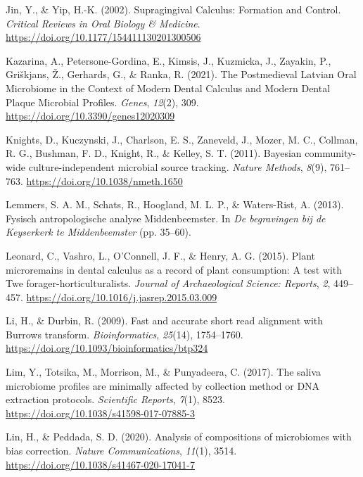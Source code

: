 \documentclass[
  b5paper,
]{book}
\newlength{\cslhangindent}
\newenvironment{CSLReferences}[2] %
 {\begin{list}{}{%
  \setlength{\itemindent}{0pt}
  \setlength{\leftmargin}{0pt}
  \setlength{\parsep}{0pt}
  \ifodd #1
   \setlength{\leftmargin}{\cslhangindent}
   \setlength{\itemindent}{-1\cslhangindent}
  \fi
  \setlength{\itemsep}{#2\baselineskip}}}
 {\end{list}}
\begin{document}
\begin{CSLReferences}{1}{0}
Jin, Y., \& Yip, H.-K. (2002). Supragingival {Calculus}: {Formation} and
{Control}. \emph{Critical Reviews in Oral Biology \& Medicine}.
\url{https://doi.org/10.1177/154411130201300506}

Kazarina, A., Petersone-Gordina, E., Kimsis, J., Kuzmicka, J., Zayakin,
P., Griškjans, Ž., Gerhards, G., \& Ranka, R. (2021). The {Postmedieval
Latvian Oral Microbiome} in the {Context} of {Modern Dental Calculus}
and {Modern Dental Plaque Microbial Profiles}. \emph{Genes},
\emph{12}(2), 309. \url{https://doi.org/10.3390/genes12020309}

Knights, D., Kuczynski, J., Charlson, E. S., Zaneveld, J., Mozer, M. C.,
Collman, R. G., Bushman, F. D., Knight, R., \& Kelley, S. T. (2011).
Bayesian community-wide culture-independent microbial source tracking.
\emph{Nature Methods}, \emph{8}(9), 761--763.
\url{https://doi.org/10.1038/nmeth.1650}

Lemmers, S. A. M., Schats, R., Hoogland, M. L. P., \& Waters-Rist, A.
(2013). {Fysisch antropologische analyse Middenbeemster}. In \emph{{De
begravingen bij de Keyserkerk te Middenbeemster}} (pp. 35--60).

Leonard, C., Vashro, L., O'Connell, J. F., \& Henry, A. G. (2015). Plant
microremains in dental calculus as a record of plant consumption: {A}
test with {Twe} forager-horticulturalists. \emph{Journal of
Archaeological Science: Reports}, \emph{2}, 449--457.
\url{https://doi.org/10.1016/j.jasrep.2015.03.009}

Li, H., \& Durbin, R. (2009). Fast and accurate short read alignment
with {Burrows} transform. \emph{Bioinformatics},
\emph{25}(14), 1754--1760.
\url{https://doi.org/10.1093/bioinformatics/btp324}

Lim, Y., Totsika, M., Morrison, M., \& Punyadeera, C. (2017). The saliva
microbiome profiles are minimally affected by collection method or {DNA}
extraction protocols. \emph{Scientific Reports}, \emph{7}(1), 8523.
\url{https://doi.org/10.1038/s41598-017-07885-3}

Lin, H., \& Peddada, S. D. (2020). Analysis of compositions of
microbiomes with bias correction. \emph{Nature Communications},
\emph{11}(1), 3514. \url{https://doi.org/10.1038/s41467-020-17041-7}


\end{CSLReferences}
\end{document}
